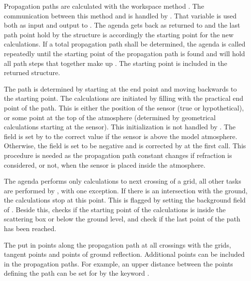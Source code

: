 Propagation paths are calculated with the workspace method
. The communication between this method and
 is handled by .
That variable is used both as input and output to
.  The agenda gets back
 as returned to  and the
last path point hold by the structure is accordingly the starting
point for the new calculations. If a total propagation path shall be
determined, the agenda is called repeatedly until the starting point
of the propagation path is found and  will hold
all path steps that together make up . The starting
point is included in the returned structure.

The path is determined by starting at the end point and moving
backwards to the starting point. The calculations are initiated by
filling  with the practical end point of the
path. This is either the position of the sensor (true or
hypothetical), or some point at the top of the atmosphere (determined
by geometrical calculations starting at the sensor). This
initialization is not handled by . 
The field  is set by 
to the correct value if the sensor is above the model atmosphere.
Otherwise, the field is set to be negative and is corrected by
 at the first call. This procedure is
needed as the propagation path constant changes if refraction is
considered, or not, when the sensor is placed inside the atmosphere.

The agenda performs only calculations to next crossing of a grid, all
other tasks are performed by , with one exception.
If there is an intersection with the ground, the calculations stop at
this point. This is flagged by setting the background field of
. Beside this,  checks if
the starting point of the calculations is inside the scattering box or
below the ground level, and check if the last point of the path has
been reached. 

The  put in points along the
propagation path at all crossings with the grids, tangent points and
points of ground reflection. Additional points can be included in the
propagation paths. For example, an upper distance between the points
defining the path can be set for  by
the keyword .



